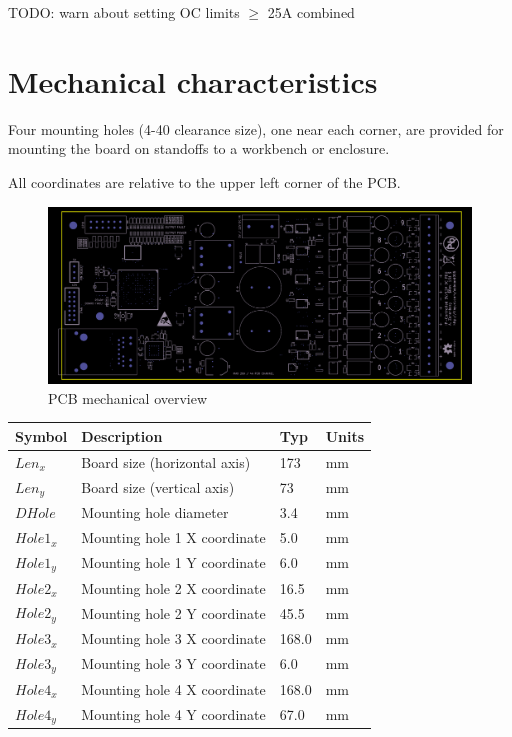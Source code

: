\documentclass{article}
\begin{document}
TODO: warn about setting OC limits $\geq$ 25A combined

\pagebreak
\section{Mechanical characteristics}

Four mounting holes (4-40 clearance size), one near each corner, are provided for mounting the board on standoffs to a 
workbench or enclosure.

All coordinates are relative to the upper left corner of the PCB.

\begin{figure}[h]
\includegraphics[scale=0.19]{silk-front-small.png}
\caption{PCB mechanical overview}
\label{silk-front}
\end{figure}

\begin{longtable}{|l|p{2in}|p{0.5in}|p{0.5in}|}
\hline
{\bf Symbol} & {\bf Description} & {\bf Typ} & {\bf Units}\\
\hline
$Len_{x}$ & Board size (horizontal axis) & 173 & mm\\
\hline
$Len_{y}$ & Board size (vertical axis) & 73 & mm\\
\hline
$DHole$ & Mounting hole diameter & 3.4 & mm\\
\hline
$Hole1_{x}$ & Mounting hole 1 X coordinate & 5.0 & mm\\
$Hole1_{y}$ & Mounting hole 1 Y coordinate & 6.0 & mm\\
\hline
$Hole2_{x}$ & Mounting hole 2 X coordinate & 16.5 & mm\\
$Hole2_{y}$ & Mounting hole 2 Y coordinate & 45.5 & mm\\
\hline
$Hole3_{x}$ & Mounting hole 3 X coordinate & 168.0 & mm\\
$Hole3_{y}$ & Mounting hole 3 Y coordinate & 6.0 & mm\\
\hline
$Hole4_{x}$ & Mounting hole 4 X coordinate & 168.0 & mm\\
$Hole4_{y}$ & Mounting hole 4 Y coordinate & 67.0 & mm\\
\hline
\end{longtable}
\end{document}
